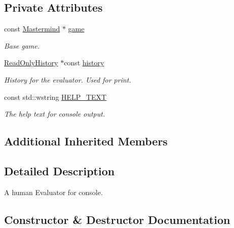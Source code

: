 \subsection*{Private Attributes}
\begin{DoxyCompactItemize}
\item 
const \hyperlink{classmastermind_1_1logic_1_1_mastermind}{Mastermind} $\ast$ \hyperlink{classmastermind_1_1logic_1_1_human_evaluator_afae62228bcb3dafc7b04be93231620d7}{game}
\begin{DoxyCompactList}\small\item\em Base game. \end{DoxyCompactList}\item 
\hyperlink{classmastermind_1_1logic_1_1_read_only_history}{Read\+Only\+History} $\ast$const \hyperlink{classmastermind_1_1logic_1_1_human_evaluator_a6929e29801dcca808ee23bf1ad3b39c9}{history}
\begin{DoxyCompactList}\small\item\em History for the evaluator. Used for print. \end{DoxyCompactList}\item 
const std\+::wstring \hyperlink{classmastermind_1_1logic_1_1_human_evaluator_ab85d06a8de3aa8fdee0db9f6880b76f8}{H\+E\+L\+P\+\_\+\+T\+E\+XT}
\begin{DoxyCompactList}\small\item\em The help text for console output. \end{DoxyCompactList}\end{DoxyCompactItemize}
\subsection*{Additional Inherited Members}


\subsection{Detailed Description}
A human Evaluator for console. 

\subsection{Constructor \& Destructor Documentation}
\hypertarget{classmastermind_1_1logic_1_1_human_evaluator_a1079556bd0f849489b63c1aba45bfac9}{}\label{classmastermind_1_1logic_1_1_human_evaluator_a1079556bd0f849489b63c1aba45bfac9} 
